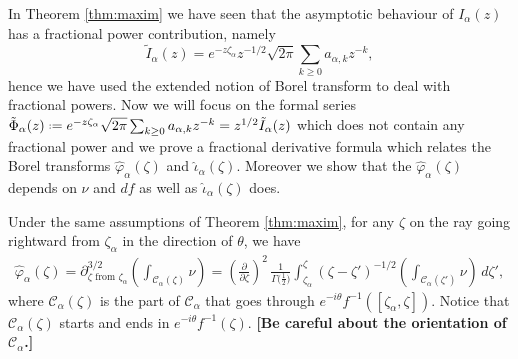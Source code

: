 \documentclass[11pt,a4paper,twoside,leqno,noamsfonts]{amsart}
\numberwithin{equation}{section}
\begin{document}
In Theorem \ref{thm:maxim} we have seen that the asymptotic behaviour of $I_\alpha(z)$ has a fractional power contribution, namely \[\tilde{I}_{\alpha}(z)=e^{-z\zeta_\alpha}z^{-1/2}\sqrt{2\pi}\sum_{k\geq 0}a_{\alpha,k}z^{-k},\] hence we have used the extended notion of Borel transform to deal with fractional powers. Now we will focus on the formal series $\tilde{\Phi}_\alpha(z)\defeq e^{-z\zeta_\alpha}\sqrt{2\pi}\sum_{k\geq 0}a_{\alpha,k}z^{-k}=z^{1/2}\tilde{I}_\alpha(z)$ which does not contain any fractional power and we prove a fractional derivative formula which relates the Borel transforms $\hat{\varphi}_\alpha(\zeta)$ and $\hat{\iota}_{\alpha}(\zeta)$. Moreover we show that the $\hat{\varphi}_{\alpha}(\zeta)$ depends on $\nu$ and $df$ as well as $\hat{\iota}_{\alpha}(\zeta)$ does. 

\begin{corollary}\label{int:deriv-formula} 
Under the same assumptions of Theorem \ref{thm:maxim}, for any $\zeta$ on the ray going rightward from $\zeta_\alpha$ in the direction of $\theta$, we have
\begin{multline}\label{formula1}
\hat{\varphi}_{\alpha}(\zeta)=\partial^{3/2}_{\zeta \text{ from }\zeta_\alpha} \left( \int_{\mathcal{C}_\alpha(\zeta)}\nu \right)={\left(\tfrac{\partial}{\partial \zeta}\right)^2}\,\frac{1}{\Gamma\big(\tfrac{1}{2}\big)} \int_{\zeta_\alpha}^\zeta (\zeta-\zeta')^{-1/2} {\left( \int_{\mathcal{C}_\alpha(\zeta')} \nu \right)}\,d\zeta',
\end{multline}
where $\mathcal{C}_\alpha(\zeta)$ is the part of $\mathcal{C}_\alpha$ that goes through $e^{-i\theta}f^{-1}([\zeta_\alpha, \zeta ])$. Notice that $\mathcal{C}_\alpha(\zeta)$ starts and ends in $e^{-i\theta}f^{-1}(\zeta)$. \textbf{[Be careful about the orientation of $\mathcal{C}_\alpha$.]}
\end{corollary}
\end{document}
